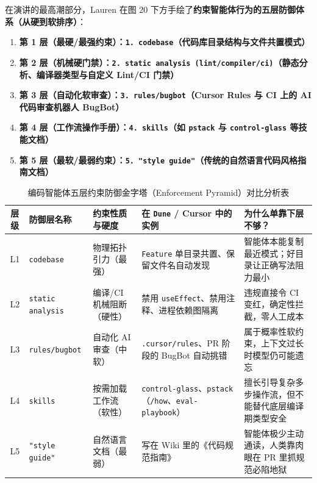 \documentclass[a4paper]{article}
\begin{document}
在演讲的最高潮部分，Lauren 在图 20 下方手绘了\textbf{约束智能体行为的五层防御体系（从硬到软排序）}：
\begin{enumerate}
  \item \textbf{第 1 层（最硬/最强约束）：\texttt{1. codebase}（代码库目录结构与文件共置模式）}
  \item \textbf{第 2 层（机械硬门禁）：\texttt{2. static analysis (lint/compiler/ci)}（静态分析、编译器类型与自定义 Lint/CI 门禁）}
  \item \textbf{第 3 层（自动化软审查）：\texttt{3. rules/bugbot}（Cursor Rules 与 CI 上的 AI 代码审查机器人 BugBot）}
  \item \textbf{第 4 层（工作流操作手册）：\texttt{4. skills}（如 \texttt{pstack} 与 \texttt{control-glass} 等技能文档）}
  \item \textbf{第 5 层（最软/最弱约束）：\texttt{5. "style guide"}（传统的自然语言代码风格指南文档）}
\end{enumerate}

\begin{table}[H]
  \centering
  \caption{编码智能体五层约束防御金字塔（Enforcement Pyramid）对比分析表}
  \small
  \begin{tabular}{c l p{2.6cm} p{3.6cm} p{4.4cm}}
    \toprule
    \textbf{层级} & \textbf{防御层名称} & \textbf{约束性质与硬度} & \textbf{在 \texttt{Dune} / Cursor 中的实例} & \textbf{为什么单靠下层不够？} \\
    \midrule
    L1 & \texttt{codebase} & 物理拓扑引力（最强） & \texttt{Feature} 单目录共置、保留文件名自动发现 & 智能体本能复制最近模式；好目录让正确写法阻力最小 \\
    L2 & \texttt{static analysis} & 编译/CI 机械阻断（硬性） & 禁用 \texttt{useEffect}、禁用注释、进程依赖图隔离 & 违规直接令 CI 变红，确定性拦截，零人工成本 \\
    L3 & \texttt{rules/bugbot} & 自动化 AI 审查（中软） & \texttt{.cursor/rules}、PR 阶段的 BugBot 自动挑错 & 属于概率性软约束，上下文过长时模型仍可能遗忘 \\
    L4 & \texttt{skills} & 按需加载工作流（软性） & \texttt{control-glass}、\texttt{pstack}（\texttt{/how}、\texttt{eval-playbook}） & 擅长引导复杂多步操作流，但不能替代底层编译期类型安全 \\
    L5 & \texttt{"style guide"} & 自然语言文档（最弱） & 写在 Wiki 里的《代码规范指南》 & 智能体极少主动通读，人类靠肉眼在 PR 里抓规范必陷地狱 \\
    \bottomrule
  \end{tabular}
\end{table}
\end{document}
